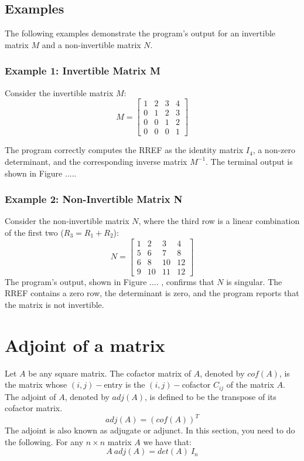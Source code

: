 \documentclass{article}
\begin{document}
\subsection{Examples}
The following examples demonstrate the program's output for an invertible matrix $M$ and a non-invertible matrix $N$.

\subsubsection{Example 1: Invertible Matrix M}
Consider the invertible matrix $M$:
\[
M = 
\begin{bmatrix}
1 & 2 & 3 & 4 \\
0 & 1 & 2 & 3 \\
0 & 0 & 1 & 2 \\
0 & 0 & 0 & 1
\end{bmatrix}
\]

The program correctly computes the RREF as the identity matrix $I_4$, a non-zero determinant, and the corresponding inverse matrix $M^{-1}$. The terminal output is shown in Figure .....

\subsubsection{Example 2: Non-Invertible Matrix N}
Consider the non-invertible matrix $N$, where the third row is a linear combination of the first two ($R_3 = R_1 + R_2$):
\[
N = 
\begin{bmatrix}
1 & 2 & 3 & 4 \\
5 & 6 & 7 & 8 \\
6 & 8 & 10 & 12 \\
9 & 10 & 11 & 12
\end{bmatrix}
\]
The program's output, shown in Figure .... , confirms that $N$ is singular. The RREF contains a zero row, the determinant is zero, and the program reports that the matrix is not invertible.

\section{Adjoint of a matrix}
{Let $A$ be any square matrix. The cofactor matrix of $A$, denoted by $cof(A)$, is the matrix whose
$(i, j)-$entry is the $(i, j)-$cofactor $C_{ij}$ of the matrix $A$. The adjoint of $A$, denoted by $adj(A)$, is defined to
be the transpose of its cofactor matrix.
\[adj(A) = (cof(A))^T\]
The adjoint is also known as adjugate or adjunct. In this section, you need to do the following.}
\thmp{}{}
{
For any $n \times n$ matrix $A$ we have that: \[A\ adj(A)= det(A)\ I_n\]
}
{

}
\end{document}
